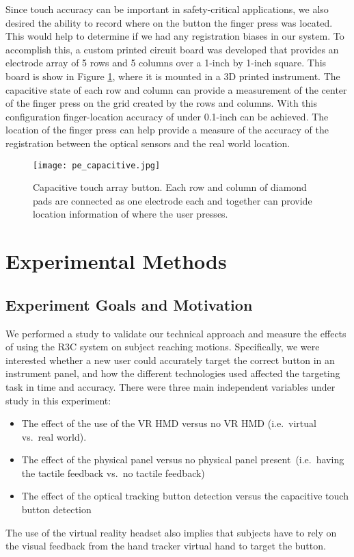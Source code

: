 Since touch accuracy can be important in safety-critical applications, we also desired the ability to record where on the button the finger press was located.
This would help to determine if we had any registration biases in our system.
To accomplish this, a custom printed circuit board was developed that provides an electrode array of 5 rows and 5 columns over a 1-inch by 1-inch square.
This board is show in Figure \ref{fig:pe_capacitive}, where it is mounted in a 3D printed instrument.
The capacitive state of each row and column can provide a measurement of the center of the finger press on the grid created by the rows and columns.
With this configuration finger-location accuracy of under 0.1-inch can be achieved.
The location of the finger press can help provide a measure of the accuracy of the registration between the optical sensors and the real world location.

\begin{figure}
    \centering
    \texttt{[image: pe\_capacitive.jpg]}
    \caption{Capacitive touch array button. Each row and column of diamond pads are connected as one electrode each and together can provide location information of where the user presses.}
    \label{fig:pe_capacitive}
\end{figure}

\section{Experimental Methods}

\subsection{Experiment Goals and Motivation}

We performed a study to validate our technical approach and measure the effects of using the R3C system on subject reaching motions.
Specifically, we were interested whether a new user could accurately target the correct button in an instrument panel, and how the different technologies used affected the targeting task in time and accuracy.
There were three main independent variables under study in this experiment:
\begin{itemize}
    \item The effect of the use of the VR HMD versus no VR HMD (i.e.\ virtual vs.\ real world).
    \item The effect of the physical panel versus no physical panel present\ (i.e.\ having the tactile feedback vs.\ no tactile feedback)
    \item The effect of the optical tracking button detection versus the capacitive touch button detection
\end{itemize}
The use of the virtual reality headset also implies that subjects have to rely on the visual feedback from the hand tracker virtual hand to target the button.

